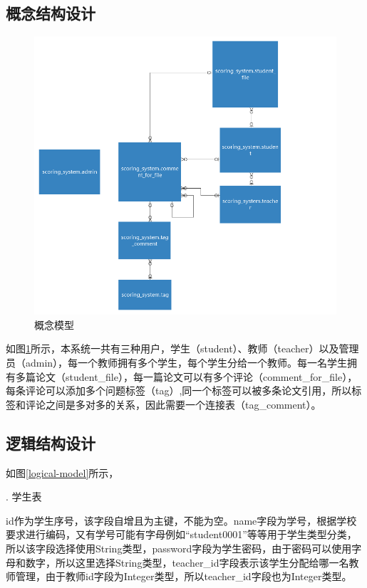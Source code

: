\subsection{概念结构设计}

\begin{figure}[htbp]
    \centering
    \includegraphics[scale = 0.5]{out/uml/数据库/conceptual-model.png}
    \caption{\song\wuhao 概念模型}
    \label{conceptual-model}
\end{figure}

如图\ref{conceptual-model}所示，本系统一共有三种用户，学生（student）、教师（teacher）以及管理员（admin），每一个教师拥有多个学生，每个学生分给一个教师。每一名学生拥有多篇论文（student\_file），每一篇论文可以有多个评论（comment\_for\_file），每条评论可以添加多个问题标签（tag）,同一个标签可以被多条论文引用，所以标签和评论之间是多对多的关系，因此需要一个连接表（tag\_comment）。

\subsection{逻辑结构设计}

如图\ref{logical-model}所示，

. 学生表

id作为学生序号，该字段自增且为主键，不能为空。name字段为学号，根据学校要求进行编码，又有学号可能有字母例如“student0001”等等用于学生类型分类，所以该字段选择使用String类型，password字段为学生密码，由于密码可以使用字母和数字，所以这里选择String类型，teacher\_id字段表示该学生分配给哪一名教师管理，由于教师id字段为Integer类型，所以teacher\_id字段也为Integer类型。

